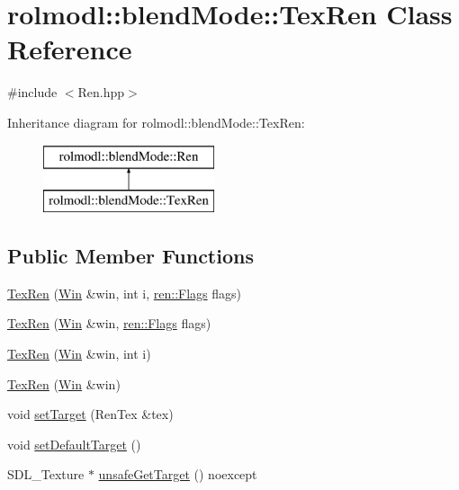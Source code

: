 \hypertarget{classrolmodl_1_1blend_mode_1_1_tex_ren}{}\section{rolmodl\+::blend\+Mode\+::Tex\+Ren Class Reference}
\label{classrolmodl_1_1blend_mode_1_1_tex_ren}


{\ttfamily \#include $<$Ren.\+hpp$>$}

Inheritance diagram for rolmodl\+::blend\+Mode\+::Tex\+Ren\+:\begin{figure}[H]
\begin{center}
\leavevmode
\includegraphics[height=2.000000cm]{classrolmodl_1_1blend_mode_1_1_tex_ren}
\end{center}
\end{figure}
\subsection*{Public Member Functions}
\begin{DoxyCompactItemize}
\item 
\mbox{\hyperlink{classrolmodl_1_1blend_mode_1_1_tex_ren_ae2c33f1543a8b6b546dea5aad6e7bab0}{Tex\+Ren}} (\mbox{\hyperlink{classrolmodl_1_1_win}{Win}} \&win, int i, \mbox{\hyperlink{structrolmodl_1_1blend_mode_1_1ren_1_1_flags}{ren\+::\+Flags}} flags)
\item 
\mbox{\hyperlink{classrolmodl_1_1blend_mode_1_1_tex_ren_a5f24efe5536afb27774aa5a33be50e9e}{Tex\+Ren}} (\mbox{\hyperlink{classrolmodl_1_1_win}{Win}} \&win, \mbox{\hyperlink{structrolmodl_1_1blend_mode_1_1ren_1_1_flags}{ren\+::\+Flags}} flags)
\item 
\mbox{\hyperlink{classrolmodl_1_1blend_mode_1_1_tex_ren_ace970afe56de6e5fd56057b1bce8027a}{Tex\+Ren}} (\mbox{\hyperlink{classrolmodl_1_1_win}{Win}} \&win, int i)
\item 
\mbox{\hyperlink{classrolmodl_1_1blend_mode_1_1_tex_ren_a0dc21b856a7f2ac2818f1c081d262d04}{Tex\+Ren}} (\mbox{\hyperlink{classrolmodl_1_1_win}{Win}} \&win)
\item 
void \mbox{\hyperlink{classrolmodl_1_1blend_mode_1_1_tex_ren_ad3a858ec69feebfdc8b05d6927b0c5b7}{set\+Target}} (Ren\+Tex \&tex)
\item 
void \mbox{\hyperlink{classrolmodl_1_1blend_mode_1_1_tex_ren_a6f4d63202a0fac9062541888144fa281}{set\+Default\+Target}} ()
\item 
S\+D\+L\+\_\+\+Texture $\ast$ \mbox{\hyperlink{classrolmodl_1_1blend_mode_1_1_tex_ren_a10f9040e96eac72a50cb89f1ee30a579}{unsafe\+Get\+Target}} () noexcept
\end{DoxyCompactItemize}


